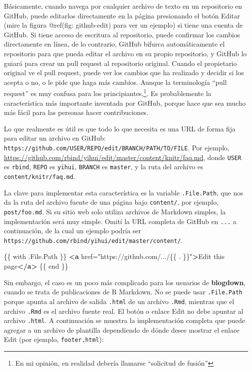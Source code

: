 \documentclass[12pt,]{krantz}
\makeatletter
\newenvironment{Shaded}{\begin{snugshade}}{\end{snugshade}}
\newcommand{\KeywordTok}[1]{\textcolor[rgb]{0.13,0.29,0.53}{\textbf{#1}}}
\newcommand{\NormalTok}[1]{#1}
\newcommand{\OtherTok}[1]{\textcolor[rgb]{0.56,0.35,0.01}{#1}}
\newcommand{\StringTok}[1]{\textcolor[rgb]{0.31,0.60,0.02}{#1}}
\newenvironment{kframe}{%
\medskip{}
\setlength{\fboxsep}{.8em}
 \def\at@end@of@kframe{}%
 \ifinner\ifhmode%
  \def\at@end@of@kframe{\end{minipage}}%
  \begin{minipage}{\columnwidth}%
 \fi\fi%
 \def\FrameCommand##1{\hskip\@totalleftmargin \hskip-\fboxsep
 \colorbox{shadecolor}{##1}\hskip-\fboxsep
     \hskip-\linewidth \hskip-\@totalleftmargin \hskip\columnwidth}%
 \MakeFramed {\advance\hsize-\width
   \@totalleftmargin\z@ \linewidth\hsize
   \@setminipage}}%
 {\par\unskip\endMakeFramed%
 \at@end@of@kframe}
\renewenvironment{Shaded}{\begin{kframe}}{\end{kframe}}
\theoremstyle{definition}
\theoremstyle{definition}
\theoremstyle{definition}
\theoremstyle{remark}
\makeatother
\begin{document}
\begin{itemize}
  Básicamente, cuando navega por cualquier archivo de texto en un
  repositorio en GitHub, puede editarlos directamente en la página
  presionando el botón Editar (mire la figura @ref(fig: github-edit)
  para ver un ejemplo) si tiene una cuenta de GitHub. Si tiene acceso de
  escritura al repositorio, puede confirmar los cambios directamente en
  línea, de lo contrario, GitHub bifurca automáticamente el repositorio
  para que pueda editar el archivo en su propio repositorio, y GitHub lo
  guiará para crear un pull request al repositorio original. Cuando el
  propietario original ve el pull request, puede ver los cambios que ha
  realizado y decidir si los acepta o no, o le pide que haga más
  cambios. Aunque la terminología ``pull request'' es muy confusa para
  los principiantes,\footnote{En mi opinión, en realidad debería
    llamarse ``solicitud de fusión''}. Es probablemente la
  característica más importante inventada por GitHub, porque hace que
  sea mucho más fácil para las personas hacer contribuciones.

  Lo que realmente es útil es que todo lo que necesita es una URL de
  forma fija para editar un archivo en GitHub:
  \texttt{https://github.com/USER/REPO/edit/BRANCH/PATH/TO/FILE}. Por
  ejemplo,
  \url{https://github.com/rbind/yihui/edit/master/content/knitr/faq.md},
  donde \texttt{USER} es \texttt{rbind}, \texttt{REPO} es
  \texttt{yihui}, \texttt{BRANCH} es \texttt{master}, y la ruta del
  archivo es \texttt{content/knitr/faq.md}.

  La clave para implementar esta característica es la variable
  \texttt{.File.Path}, que nos da la ruta del archivo fuente de una
  página bajo \texttt{content/}, por ejemplo, \texttt{post/foo.md}. Si
  su sitio web solo utiliza archivos de Markdown simples, la
  implementación será muy simple. Omití la URL completa de GitHub en
  \texttt{...} a continuación, de la cual un ejemplo podría ser
  \texttt{https://github.com/rbind/yihui/edit/master/content/}.

\begin{Shaded}
\begin{Highlighting}[]
\NormalTok{\{\{ with .File.Path \}\}}
\KeywordTok{<a}\OtherTok{ href=}\StringTok{"https://github.com/.../\{\{ . \}\}"}\KeywordTok{>}\NormalTok{Edit this page}\KeywordTok{</a>}
\NormalTok{\{\{ end \}\}}
\end{Highlighting}
\end{Shaded}

  Sin embargo, el caso es un poco más complicado para los usuarios de
  \textbf{blogdown}, cuando se trata de publicaciones de R Markdown. No
  se puede usar \texttt{.File.Path} porque apunta al archivo de salida
  \texttt{.html} de un archivo \texttt{.Rmd}, mientras que el archivo
  \texttt{.Rmd} es el archivo fuente real. El botón o enlace Edit no
  debe apuntar al archivo \texttt{.html}. A continuación se muestra la
  implementación completa que puede agregar a un archivo de plantilla
  dependiendo de dónde desee mostrar el enlace Edit (por ejemplo,
  \texttt{footer.html}):


\end{itemize}
\end{document}
